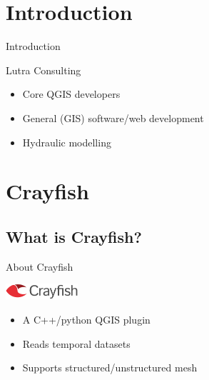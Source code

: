 \section{Introduction}

\begin{frame}{Introduction}
	\begin{block}{Lutra Consulting}
		\begin{itemize}
			\item Core QGIS developers
			\item General (GIS) software/web development
			\item Hydraulic modelling
		\end{itemize}
	\end{block}
\end{frame}

\section{Crayfish}
\subsection{What is Crayfish?}
\begin{frame}{About Crayfish}
	\begin{block}{ {\includegraphics[width=0.2\textwidth]{crayfishlogo.png}}	}
		\begin{itemize}
			\item A C++/python QGIS plugin
			\item Reads temporal datasets
			\item Supports structured/unstructured mesh
		\end{itemize}
	\end{block}

\end{frame}

